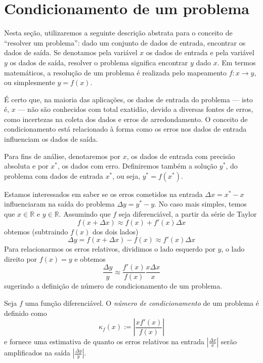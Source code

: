 \section{Condicionamento de um problema}
Nesta seção, utilizaremos a seguinte descrição abstrata para o conceito de ``resolver um problema'': dado um conjunto de dados de entrada, encontrar os dados de saída. Se denotamos pela variável $x$ os dados de entrada e pela variável $y$ os dados de saída, resolver o problema significa encontrar $y$ dado $x$. Em termos matemáticos, a resolução de um problema é realizada pelo mapeamento $f:x \rightarrow y$, ou simplesmente $y = f(x)$.

É certo que, na maioria das aplicações, os dados de entrada do problema --- isto é, $x$ --- não são conhecidos com total exatidão, devido a diversas fontes de erros, como incertezas na coleta dos dados e erros de arredondamento. O conceito de condicionamento está relacionado à forma como os erros nos dados de entrada influenciam os dados de saída.

Para fins de análise, denotaremos por $x$, os dados de entrada com precisão absoluta e por $x^*$, os dados com erro. Definiremos também a solução $y^*$, do problema com dados de entrada $x^*$, ou seja, $y^* = f(x^*)$.

Estamos interessados em saber se os erros cometidos na entrada $\Delta x=x^*-x $ influenciaram na saída do problema $\Delta y=y^*-y$. No caso mais simples, temos que $x \in \mathbb{R}$ e $y \in \mathbb{R}$. Assumindo que $f$ seja diferenciável, a partir da série de Taylor
\begin{equation}
 f(x+\Delta x) \approx f(x) + f'(x) \Delta x
\end{equation}
obtemos (subtraindo $f(x)$ dos dois lados)
\begin{equation}
 \Delta y = f(x+\Delta x)-f(x) \approx f'(x) \Delta x
\end{equation}
Para relacionarmos os erros relativos, dividimos o lado esquerdo por $y$, o lado direito por $f(x)=y$ e obtemos
\begin{equation}
 \frac{ \Delta y}{y} \approx \frac{f'(x)}{f(x)}  \frac{x \Delta x}{x}
\end{equation}
sugerindo a definição de número de condicionamento de um problema.

\begin{defn}
Seja $f$ uma função diferenciável. O \emph{número de condicionamento} de um problema é definido como
\begin{equation}
  \kappa_f(x) := \left| \frac{ x f'(x)}{f(x)} \right|
\end{equation}
e fornece uma estimativa de quanto os erros relativos na entrada $\left|\frac{\Delta x}{x}\right|$ serão amplificados na saída $\left|\frac{\Delta y}{y}\right|$.
\end{defn}

